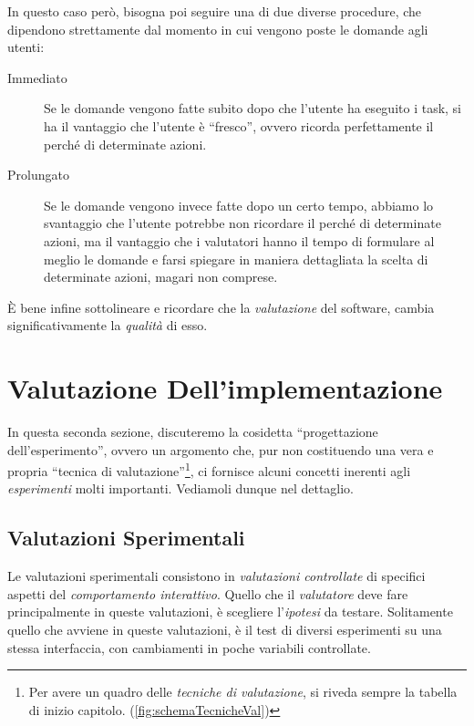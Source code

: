 \documentclass[oneside]{book}
\begin{document}
				In questo caso però, bisogna poi seguire una di due diverse procedure, che dipendono strettamente dal momento in cui vengono poste le domande agli utenti:
				\begin{description}
				\item[Immediato] Se le domande vengono fatte subito dopo che l'utente ha eseguito i task, si ha il vantaggio che l'utente è ``fresco'', ovvero ricorda perfettamente il perché di determinate azioni.
				\item[Prolungato] Se le domande vengono invece fatte dopo un certo tempo, abbiamo lo svantaggio che l'utente potrebbe non ricordare il perché di determinate azioni, ma il vantaggio che i valutatori hanno il tempo di formulare al meglio le domande e farsi spiegare in maniera dettagliata la scelta di determinate azioni, magari non comprese.
				\end{description}

				È bene infine sottolineare e ricordare che la \emph{valutazione} del software, cambia significativamente la \emph{qualità} di esso. 

				\pagebreak

	\section{Valutazione Dell'implementazione}
		In questa seconda sezione, discuteremo la cosidetta ``progettazione dell'esperimento'', ovvero un argomento che, pur non costituendo una vera e propria ``tecnica di valutazione''\footnote{ Per avere un quadro delle \emph{tecniche di valutazione}, si riveda sempre la tabella di inizio capitolo. (\ref{fig:schemaTecnicheVal})}, ci fornisce alcuni concetti inerenti agli \emph{esperimenti} molti importanti. Vediamoli dunque nel dettaglio.

		\subsection{Valutazioni Sperimentali}
			Le valutazioni sperimentali consistono in \emph{valutazioni controllate} di specifici aspetti del \emph{comportamento interattivo}. Quello che il \emph{valutatore} deve fare principalmente in queste valutazioni, è scegliere l'\emph{ipotesi} da testare. Solitamente quello che avviene in queste valutazioni, è il test di diversi esperimenti su una stessa interfaccia, con cambiamenti in poche variabili controllate. \\
\end{document}
